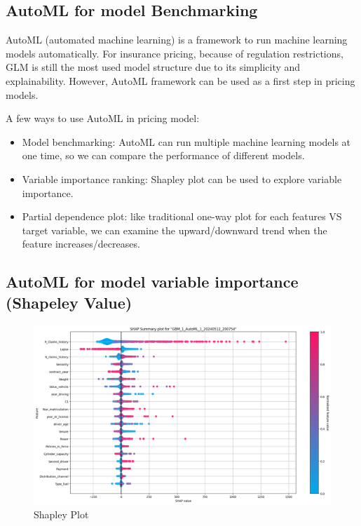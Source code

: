\documentclass{article}
\begin{document}
\subsection{AutoML for model Benchmarking} 

AutoML (automated machine learning) is a framework to run machine learning models automatically. For insurance pricing, because of regulation restrictions, GLM is still the most used model structure due to its simplicity and explainability. However, AutoML framework can be used as a first step in pricing models. 

A few ways to use AutoML in pricing model:
\begin{itemize}
    \item Model benchmarking: AutoML can run multiple machine learning models at one time, so we can compare the performance of different models.
    \item Variable importance ranking: Shapley plot can be used to explore variable importance.
    \item Partial dependence plot: like traditional one-way plot for each features VS target variable, we can examine the upward/downward trend when the feature increases/decreases.
\end{itemize}
 
\subsection{AutoML for model variable importance (Shapeley Value)} 

\begin{figure}[h!]
\centering
\includegraphics[scale=0.4]{shap_plot.png}
\caption{Shapley Plot}
\label{fig:univerise}
\end{figure}
\end{document}

